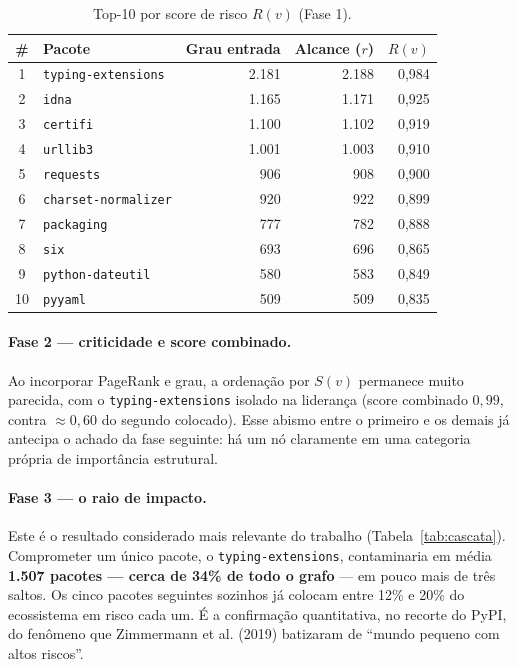 \documentclass[11pt,a4paper]{article}
\begin{document}
\begin{table}[h]
\centering\small
\caption{Top-10 por score de risco $R(v)$ (Fase 1).}
\label{tab:risco}
\begin{tabular}{clrrr}
\toprule
\# & Pacote & Grau entrada & Alcance ($r$) & $R(v)$ \\
\midrule
1 & \texttt{typing-extensions} & 2.181 & 2.188 & 0,984 \\
2 & \texttt{idna}              & 1.165 & 1.171 & 0,925 \\
3 & \texttt{certifi}           & 1.100 & 1.102 & 0,919 \\
4 & \texttt{urllib3}           & 1.001 & 1.003 & 0,910 \\
5 & \texttt{requests}          &   906 &   908 & 0,900 \\
6 & \texttt{charset-normalizer}&   920 &   922 & 0,899 \\
7 & \texttt{packaging}         &   777 &   782 & 0,888 \\
8 & \texttt{six}               &   693 &   696 & 0,865 \\
9 & \texttt{python-dateutil}   &   580 &   583 & 0,849 \\
10& \texttt{pyyaml}            &   509 &   509 & 0,835 \\
\bottomrule
\end{tabular}
\end{table}

\paragraph{Fase 2 --- criticidade e score combinado.}
Ao incorporar PageRank e grau, a ordenação por $S(v)$ permanece muito parecida, com
o \texttt{typing-extensions} isolado na liderança (score combinado $0{,}99$,
contra $\approx 0{,}60$ do segundo colocado). Esse abismo entre o primeiro e os
demais já antecipa o achado da fase seguinte: há um nó claramente em uma categoria
própria de importância estrutural.

\paragraph{Fase 3 --- o raio de impacto.}
Este é o resultado considerado mais relevante do trabalho
(Tabela~\ref{tab:cascata}). Comprometer um único pacote, o \texttt{typing-extensions},
contaminaria em média \textbf{1.507 pacotes --- cerca de 34\% de todo o grafo} --- em
pouco mais de três saltos. Os cinco pacotes seguintes sozinhos já colocam entre 12\%
e 20\% do ecossistema em risco cada um. É a confirmação quantitativa, no recorte do
PyPI, do fenômeno que Zimmermann et al. (2019) batizaram de ``mundo pequeno com
altos riscos''.
\end{document}
